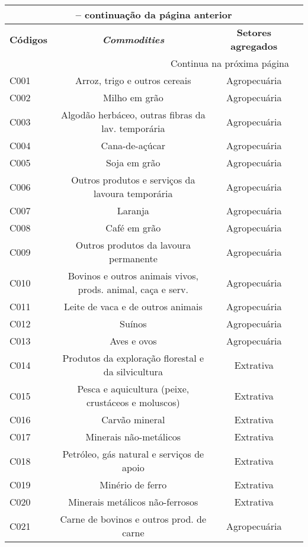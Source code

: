 \begin{apendicesenv}
\begin{small}
\begin{center}
\begin{longtable}{lccc}
				\multicolumn{3}{c}{{\bfseries \tablename\ \thetable{} -- continuação da página anterior}} \\
				\hline
				\multirow{2}{*}{\textbf{Códigos}} & \multirow{2}{*}{\textbf{\textit{Commodities}}} & \multirow{2}{*}{\textbf{Setores agregados}} \\
				&  &  \\ \hline \endhead

				\hline \multicolumn{3}{r}{{Continua na próxima página}} \\ \hline
				\endfoot

				\hline \endlastfoot

				C001 & Arroz, trigo e outros cereais & Agropecuária \\
				C002 & Milho em grão & Agropecuária \\
				C003 & Algodão herbáceo, outras fibras da lav. temporária & Agropecuária \\
				C004 & Cana-de-açúcar & Agropecuária \\
				C005 & Soja  em grão & Agropecuária \\
				C006 & Outros produtos e serviços da lavoura temporária & Agropecuária \\
				C007 & Laranja & Agropecuária \\
				C008 & Café em grão & Agropecuária \\
				C009 & Outros produtos da lavoura permanente & Agropecuária \\
				C010 & Bovinos e outros animais vivos, prods. animal, caça e serv. & Agropecuária \\
				C011 & Leite de vaca e de outros animais & Agropecuária \\
				C012 & Suínos & Agropecuária \\
				C013 & Aves e ovos & Agropecuária \\
				C014 & Produtos da exploração florestal e da silvicultura & Extrativa \\
				C015 & Pesca e aquicultura (peixe, crustáceos e moluscos) & Extrativa \\
				C016 & Carvão mineral & Extrativa \\
				C017 & Minerais não-metálicos & Extrativa \\
				C018 & Petróleo, gás natural e serviços de apoio & Extrativa \\
				C019 & Minério de ferro & Extrativa \\
				C020 & Minerais metálicos não-ferrosos & Extrativa \\
				C021 & Carne de bovinos e outros prod. de carne & Agropecuária \\

\end{longtable}
\end{center}
\end{small}
\end{apendicesenv}
